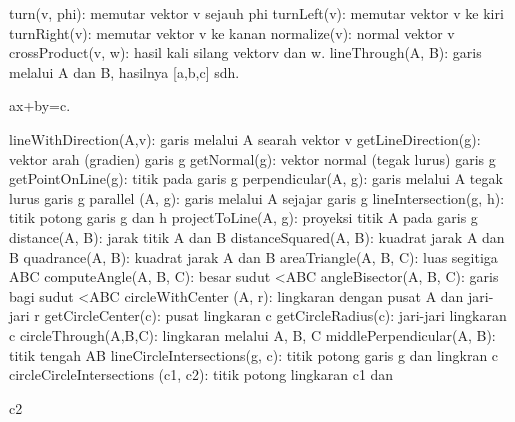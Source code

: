 \documentclass[a4paper,10pt]{article}
\begin{document}
\begin{eulernotebook}
\begin{eulercomment}
\begin{eulercomment}
\begin{eulercomment}
\begin{eulercomment}
\begin{eulercomment}
\begin{eulercomment}
\begin{eulercomment}
\begin{eulercomment}
\begin{eulercomment}
\begin{eulercomment}
\begin{eulercomment}
\begin{eulercomment}
\begin{eulercomment}
\begin{eulercomment}
\begin{eulercomment}
\begin{eulercomment}
\begin{eulercomment}
\begin{eulercomment}
\begin{eulercomment}
\begin{eulercomment}
\begin{eulercomment}
\begin{eulercomment}
\begin{eulercomment}
\begin{eulercomment}
\begin{eulercomment}
\begin{eulercomment}
\begin{eulercomment}
\begin{eulercomment}
\begin{eulercomment}
\begin{eulercomment}
\begin{eulercomment}
\end{eulercomment}
\begin{eulerttcomment}
  turn(v, phi): memutar vektor v sejauh phi
  turnLeft(v):   memutar vektor v ke kiri
  turnRight(v):  memutar vektor v ke kanan
  normalize(v): normal vektor v
  crossProduct(v, w): hasil kali silang vektorv dan w.
  lineThrough(A, B): garis melalui A dan B, hasilnya [a,b,c] sdh.
\end{eulerttcomment}
\begin{eulercomment}
ax+by=c.\\
\end{eulercomment}
\begin{eulerttcomment}
  lineWithDirection(A,v): garis melalui A searah vektor v
  getLineDirection(g): vektor arah (gradien) garis g
  getNormal(g): vektor normal (tegak lurus) garis g
  getPointOnLine(g):  titik pada garis g
  perpendicular(A, g):  garis melalui A tegak lurus garis g
  parallel (A, g):  garis melalui A sejajar garis g
  lineIntersection(g, h):  titik potong garis g dan h
  projectToLine(A, g):   proyeksi titik A pada garis g
  distance(A, B):  jarak titik A dan B
  distanceSquared(A, B):  kuadrat jarak A dan B
  quadrance(A, B): kuadrat jarak A dan B
  areaTriangle(A, B, C):  luas segitiga ABC
  computeAngle(A, B, C):   besar sudut <ABC
  angleBisector(A, B, C): garis bagi sudut <ABC
  circleWithCenter (A, r): lingkaran dengan pusat A dan jari-jari r
  getCircleCenter(c):  pusat lingkaran c
  getCircleRadius(c):  jari-jari lingkaran c
  circleThrough(A,B,C):  lingkaran melalui A, B, C
  middlePerpendicular(A, B): titik tengah AB
  lineCircleIntersections(g, c): titik potong garis g dan lingkran c
  circleCircleIntersections (c1, c2):  titik potong lingkaran c1 dan
\end{eulerttcomment}
\begin{eulercomment}
c2\\
\end{eulercomment}
\begin{eulerttcomment}

\end{eulerttcomment}
\end{eulercomment}
\end{eulercomment}
\end{eulercomment}
\end{eulercomment}
\end{eulercomment}
\end{eulercomment}
\end{eulercomment}
\end{eulercomment}
\end{eulercomment}
\end{eulercomment}
\end{eulercomment}
\end{eulercomment}
\end{eulercomment}
\end{eulercomment}
\end{eulercomment}
\end{eulercomment}
\end{eulercomment}
\end{eulercomment}
\end{eulercomment}
\end{eulercomment}
\end{eulercomment}
\end{eulercomment}
\end{eulercomment}
\end{eulercomment}
\end{eulercomment}
\end{eulercomment}
\end{eulercomment}
\end{eulercomment}
\end{eulercomment}
\end{eulercomment}
\end{eulernotebook}
\end{document}
